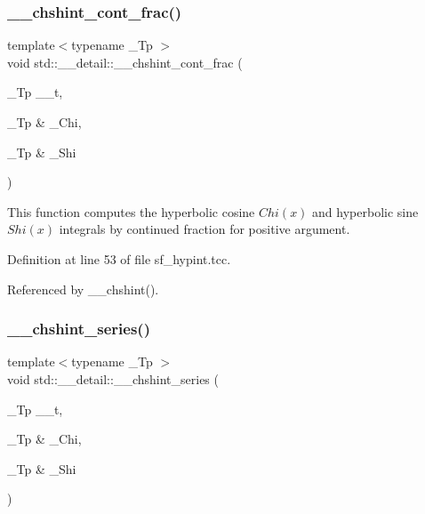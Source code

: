 \mbox{\label{namespacestd_1_1____detail_a07da2303d36d77bfad393a7b8ebdf686}} 
\subsubsection{\texorpdfstring{\+\_\+\+\_\+chshint\+\_\+cont\+\_\+frac()}{\_\_chshint\_cont\_frac()}}
{\footnotesize\ttfamily template$<$typename \+\_\+\+Tp $>$ \\
void std\+::\+\_\+\+\_\+detail\+::\+\_\+\+\_\+chshint\+\_\+cont\+\_\+frac (\begin{DoxyParamCaption}\item[{\+\_\+\+Tp}]{\+\_\+\+\_\+t,  }\item[{\+\_\+\+Tp \&}]{\+\_\+\+Chi,  }\item[{\+\_\+\+Tp \&}]{\+\_\+\+Shi }\end{DoxyParamCaption})}



This function computes the hyperbolic cosine $ Chi(x) $ and hyperbolic sine $ Shi(x) $ integrals by continued fraction for positive argument. 



Definition at line 53 of file sf\+\_\+hypint.\+tcc.



Referenced by \+\_\+\+\_\+chshint().

\mbox{\label{namespacestd_1_1____detail_a16055b6e4baa35ffe5c6d9495d9d0158}} 
\subsubsection{\texorpdfstring{\+\_\+\+\_\+chshint\+\_\+series()}{\_\_chshint\_series()}}
{\footnotesize\ttfamily template$<$typename \+\_\+\+Tp $>$ \\
void std\+::\+\_\+\+\_\+detail\+::\+\_\+\+\_\+chshint\+\_\+series (\begin{DoxyParamCaption}\item[{\+\_\+\+Tp}]{\+\_\+\+\_\+t,  }\item[{\+\_\+\+Tp \&}]{\+\_\+\+Chi,  }\item[{\+\_\+\+Tp \&}]{\+\_\+\+Shi }\end{DoxyParamCaption})}



